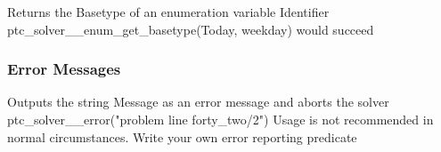 \documentclass{article}
\begin{document}
        {Returns the Basetype of an enumeration variable Identifier}
        {ptc\_solver\_\_enum\_get\_basetype(Today, weekday) would succeed}
        {}

\subsubsection{Error Messages}

\hspace{\parindent}
        {Outputs the string Message as an error message and aborts the solver}
        {ptc\_solver\_\_error("problem line forty\_two/2")}
        {Usage is not recommended in normal circumstances. Write your own error
reporting predicate}

%
%

\end{document}
